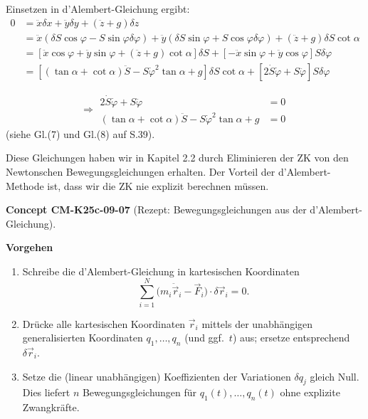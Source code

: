 \documentclass[10pt, letterpaper]{article}
\newcommand{\CustomHeading}[3]{%
  \par\medskip\noindent%
  \textbf{#1 #2} \textnormal{(#3)}.\enskip%
}
\newenvironment{CONC}[2]{\begin{unitbox}\CustomHeading{Concept}{#1}{#2}}{\end{unitbox}}
\begin{document}
Einsetzen in d'Alembert-Gleichung ergibt:
\[\begin{aligned}
0 &= \ddot{x}\delta x + \ddot{y}\delta y + (\ddot{z}+g)\delta z \\
&= \ddot{x}(\delta S\cos\varphi - S\sin\varphi\delta\varphi) + \ddot{y}(\delta S\sin\varphi + S\cos\varphi\delta\varphi) + (\ddot{z}+g)\delta S\cot\alpha \\
&= [\ddot{x}\cos\varphi + \ddot{y}\sin\varphi + (\ddot{z}+g)\cot\alpha]\delta S + [-\ddot{x}\sin\varphi + \ddot{y}\cos\varphi]S\delta\varphi \\
&= [(\tan\alpha + \cot\alpha)\ddot{S} - S\dot{\varphi}^2\tan\alpha + g]\delta S\cot\alpha + [2\dot{S}\dot{\varphi} + S\ddot{\varphi}]S\delta\varphi
\end{aligned}\]

\[\Rightarrow \boxed{
\begin{aligned}
2\dot{S}\dot{\varphi} + S\ddot{\varphi} &= 0 \\
(\tan\alpha + \cot\alpha)\ddot{S} - S\dot{\varphi}^2\tan\alpha + g &= 0
\end{aligned}
}\]
(siehe Gl.(7) und Gl.(8) auf S.39).

Diese Gleichungen haben wir in Kapitel 2.2 durch Eliminieren der ZK von den Newtonschen Bewegungsgleichungen erhalten. Der Vorteil der d'Alembert-Methode ist, dass wir die ZK nie explizit berechnen müssen.





\begin{CONC}{CM-K25c-09-07}{Rezept: Bewegungsgleichungen aus der d’Alembert-Gleichung}
\textbf{Vorgehen}\\[-4pt]
\begin{enumerate}
  \item Schreibe die d’Alembert-Gleichung in kartesischen Koordinaten
        \[
          \sum_{i=1}^{N}
            \bigl(m_i\ddot{\vec r}_i-\vec F_i\bigr)\!\cdot\!\delta\vec r_i = 0 .
        \]
  \item Drücke alle kartesischen Koordinaten $\vec r_i$ mittels der
        unabhängigen generalisierten Koordinaten
        $q_1,\dots,q_n$ (und ggf.\ $t$) aus; ersetze entsprechend
        $\delta\vec r_i$.
  \item Setze die (linear unabhängigen) Koeffizienten der Variationen
        $\delta q_j$ gleich Null.  
        Dies liefert $n$ Bewegungsgleichungen für
        $q_1(t),\dots,q_n(t)$ ohne explizite Zwangkräfte.
\end{enumerate}
\end{CONC}
\end{document}
